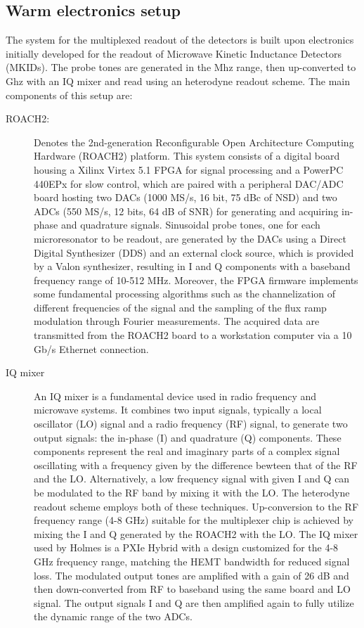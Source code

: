 \subsection{Warm electronics setup}
The system for the multiplexed readout of the detectors is built upon electronics initially developed for the readout of
Microwave Kinetic Inductance Detectors (MKIDs). The probe tones are generated in the Mhz range, then up-converted to Ghz with an IQ mixer and read using an heterodyne readout scheme. The main components of
this setup are:
\begin{description}
\item[ROACH2:] Denotes the 2nd-generation Reconfigurable Open Architecture Computing Hardware (ROACH2) platform.
This system consists of a digital board housing a Xilinx Virtex 5.1 FPGA for signal processing and a PowerPC
440EPx for slow control, which are paired with a peripheral DAC/ADC board hosting two DACs (1000 MS/s, 16 bit, 75 dBc of NSD) and two ADCs (550 MS/s, 12 bits, 64 dB of SNR) for generating and acquiring in-phase and quadrature signals.
Sinusoidal probe tones, one for each microresonator to be readout, are generated by the DACs using a Direct Digital
Synthesizer (DDS) and an external clock source, which is provided by a Valon synthesizer, resulting in I and Q
components with a baseband frequency range of 10-512 MHz.
Moreover, the FPGA firmware implements some fundamental processing algorithms such as the channelization of
different frequencies of the signal and the sampling of the flux ramp modulation through Fourier measurements.
The acquired data are transmitted from the ROACH2 board to a workstation computer via a 10 Gb/s Ethernet connection.

\item[IQ mixer] 
An IQ mixer is a fundamental device used in radio frequency and microwave
systems. It combines two input signals, typically a local oscillator (LO) signal and a radio frequency (RF) signal, to
generate two output signals: the in-phase (I) and quadrature (Q) components. These components represent the real
and imaginary parts of a complex signal oscillating with a frequency given by the difference bewteen that of the RF and
the LO. Alternatively, a low frequency signal with given I and Q can be modulated to the RF band by mixing it with
the LO. The heterodyne readout scheme employs both of these techniques. Up-conversion to the RF frequency range (4-8 GHz)
suitable for the multiplexer chip is achieved by mixing the I and Q generated by the ROACH2 with the LO. The IQ mixer
used by Holmes is a PXIe Hybrid with a design customized for the 4-8 GHz frequency range, matching the HEMT
bandwidth for reduced signal loss.
The modulated output tones are amplified with a gain of 26 dB and then down-converted from RF to baseband using the same
board and LO signal. The output signals I and Q are then amplified again to fully utilize the dynamic range of the two ADCs.


\end{description}
